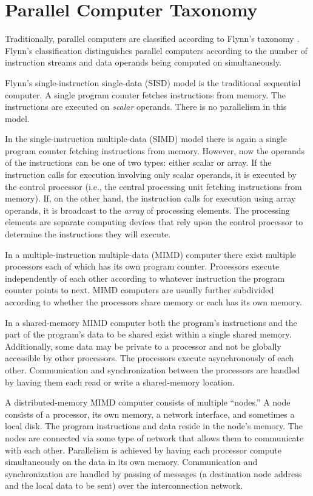 \documentclass{report}
\begin{document}
\section*{Parallel Computer Taxonomy}

Traditionally, parallel computers are classified according to Flynn's
taxonomy \cite{Fl72}.  Flynn's classification distinguishes parallel computers
according to the number of instruction streams and data operands being
computed on simultaneously.  

Flynn's single-instruction single-data (SISD) model is the traditional
sequential computer.  A single program counter fetches instructions from
memory.  The instructions are executed on {\em scalar} operands.  There is no
parallelism in this model.

In the single-instruction multiple-data (SIMD) model there is again a single
program counter fetching instructions from memory.  However, now the operands
of the instructions can be one of two types: either scalar or array.  If the
instruction calls for execution involving only scalar operands, it is executed
by the control processor (i.e., the central processing unit fetching
instructions from memory).  If, on the other hand, the instruction calls for
execution using array operands, it is broadcast to the {\em array} of
processing elements.  The processing elements are separate computing devices
that rely upon the control processor to determine the instructions they will
execute.

In a multiple-instruction multiple-data (MIMD) computer there exist multiple
processors each of which has its own program counter.  Processors execute
independently of each other according to whatever instruction the program
counter points to next.  MIMD computers are usually further subdivided
according to whether the processors share memory or each has its own memory.

In a shared-memory MIMD computer both the program's instructions and the part
of the program's data to be shared exist within a single shared memory.
Additionally, some data may be private to a processor and not be globally
accessible by other processors.  The processors execute asynchronously of each
other.  Communication and synchronization between the processors are handled
by having them each read or write a shared-memory location.

A distributed-memory MIMD computer consists of multiple ``nodes.''  A node
consists of a processor, its own memory, a network interface, and sometimes a
local disk.  The program instructions and data reside in the node's memory.
The nodes are connected via some type of network that allows them to
communicate with each other.  Parallelism is achieved by having each processor
compute simultaneously on the data in its own memory.  Communication and
synchronization are handled by passing of messages (a destination node address
and the local data to be sent) over the interconnection network.
\end{document}
